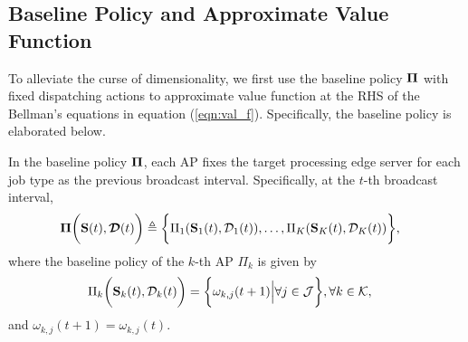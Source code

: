 \subsection{Baseline Policy and Approximate Value Function}
\label{subsec:baseline}
To alleviate the curse of dimensionality, we first use the baseline policy $\boldsymbol{\Pi}$ with fixed dispatching actions to approximate value function at the RHS of the Bellman's equations in equation (\ref{eqn:val_f}).
Specifically, the baseline policy is elaborated below.

\begin{definition}
    In the baseline policy $\boldsymbol{\Pi}$, each AP fixes the target processing edge server for each job type as the previous broadcast interval. Specifically, at the $t$-th broadcast interval,
    {\small
    \begin{align}
        \boldsymbol{\Pi}\bigg(\mathbf{S}(t),\boldsymbol{\mathcal{D}}(t)\bigg) &\triangleq \bigg\{ 
            \Pi_{1}(\mathbf{S}_{1}(t),\mathcal{D}_{1}(t)),
            \dots,
            \Pi_{K}(\mathbf{S}_{K}(t),\mathcal{D}_{K}(t))
        \bigg\},
    \end{align}
    }
    where the baseline policy of the $k$-th AP $\Pi_k$ is given by 
    {\small
    \begin{align}
        \Pi_{k}\bigg(\mathbf{S}_{k}(t),\mathcal{D}_{k}(t)\bigg)
        &= \bigg\{
            {\omega}_{k,j}(t+1) \Big| \forall j\in\mathcal{J}
        \bigg\}, \forall k\in\mathcal{K},
    \end{align}
    }
    and $\omega_{k,j}(t+1) = \omega_{k,j}(t)$.
\end{definition}

%

